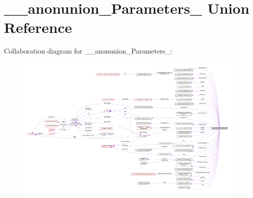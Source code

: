 \hypertarget{union____anonunion__Parameters__55}{}\section{\+\_\+\+\_\+anonunion\+\_\+\+Parameters\+\_ Union Reference}
\label{union____anonunion__Parameters__55}


Collaboration diagram for \+\_\+\+\_\+anonunion\+\_\+\+Parameters\+\_\+:
\nopagebreak
\begin{figure}[H]
\begin{center}
\leavevmode
\includegraphics[width=350pt]{union____anonunion__Parameters__55__coll__graph}
\end{center}
\end{figure}

